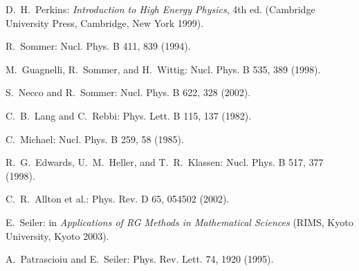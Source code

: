 \begin{enumerate}[label={[\arabic*]}]
  \item D.~H.~Perkins: \emph{Introduction to High Energy Physics}, 4th ed.
        (Cambridge University Press, Cambridge, New York 1999).
  \item R.~Sommer: Nucl. Phys. B 411, 839 (1994).
  \item M.~Guagnelli, R.~Sommer, and H.~Wittig: Nucl. Phys. B 535, 389 (1998).
  \item S.~Necco and R.~Sommer: Nucl. Phys. B 622, 328 (2002).
  \item C.~B.~Lang and C.~Rebbi: Phys. Lett. B 115, 137 (1982).
  \item C.~Michael: Nucl. Phys. B 259, 58 (1985).
  \item R.~G.~Edwards, U.~M.~Heller, and T.~R.~Klassen: Nucl. Phys. B 517, 377
        (1998).
  \item C.~R.~Allton et al.: Phys. Rev. D 65, 054502 (2002).
  \item E.~Seiler: in \emph{Applications of RG Methods in Mathematical
        Sciences} (RIMS, Kyoto University, Kyoto 2003).
  \item A.~Patrascioiu and E.~Seiler: Phys. Rev. Lett. 74, 1920 (1995).
\end{enumerate}
